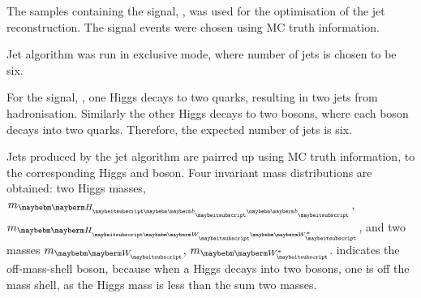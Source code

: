 The samples containing the signal, \eeToHHbbWWHad, was used for the optimisation of the jet reconstruction. The signal events were chosen using MC truth information. 

Jet algorithm was run in exclusive mode, where number of jets is chosen to be six. 

For the signal, \eeToHHbbWWHad, one Higgs decays to two \Pbottom quarks, resulting in two jets from hadronisation. Similarly the other Higgs decays to two \PW bosons, where each \PW boson decays into two quarks. Therefore, the expected number of jets is six. 

Jets produced by the \kt jet algorithm are pairred up using MC truth information, to the corresponding Higgs and \PW boson. Four invariant mass distributions are obtained: two Higgs masses, $m_{\Hbb}$, $m_{\HWW}$, and two \PW masses $m_{\PW}$, $m_{\W*}$. \W* indicates the off-mass-shell \PW boson, because when a Higgs decays into two \PW bosons, one \PW is off the mass shell, as the Higgs mass is less than the sum two \PW masses.





\begin{comment}
Jet reconstruction is performed using the FastJet package \cite{} via the MarlinFastJet \cite{} interface.

At the CLIC, due to the high level of induced background, it has been proven that the employment of algorithms designed for hadronic collider, like the longitudinal invariant $k_t$ algorithm \cite{}, is preferable to more classical electron-positron algorithms \cite{}, like the Durham algorithm \cite{}.
The VLC algorithm \cite{} has been developed as an attempt to include the good features of hadron collider jet algorithms, in particular the resilience against induced background, in an algorithm optimised for lepton colliders. In the \HHbbbb channel the VLC algorithm has been shown to perform better than the longitudinal invariant $k_t$ algorithm, it has therefore been used for this channel. %

Jet algorithms at CLIC are run in ``exclusive mode'', the algorithm will stop when the required number of jets is reached. For the \HHbbbb channel, 4 jets are expected from the $b$-quarks hadronisation, while for the \HHWWbb channel, 6, 4 and 2 jets are expected depending on the final states. Hence, clustering in a different number of jets is required according to the event categorisation.

The optimal value for the jet R parameter is optimised separately for the individual channels. The results are reported in Table  . The difference between the channels is mostly justify by the difference between b-jets and light-quark-jets. \\
\end{comment}


